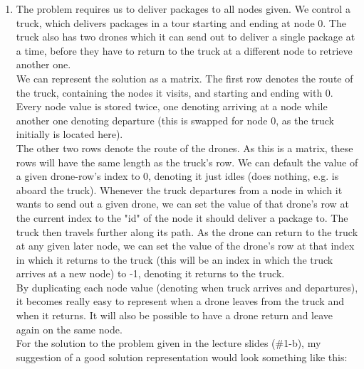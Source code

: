 \documentclass{article}
\begin{document}
\begin{enumerate}[label=(\alph*)]

    \item The problem requires us to deliver packages to all nodes given. We control a truck, which delivers packages in a tour starting and ending at node 0. The truck also has two drones which it can send out to deliver a single package at a time, before they have to return to the truck at a different node to retrieve another one.
    \\[10pt]
    We can represent the solution as a matrix. The first row denotes the route of the truck, containing the nodes it visits, and starting and ending with 0. Every node value is stored twice, one denoting arriving at a node while another one denoting departure (this is swapped for node 0, as the truck initially is located here).
    \\[10pt]
    The other two rows denote the route of the drones. As this is a matrix, these rows will have the same length as the truck's row. We can default the value of a given drone-row's index to 0, denoting it just idles (does nothing, e.g. is aboard the truck). Whenever the truck departures from a node in which it wants to send out a given drone, we can set the value of that drone's row at the current index to the "id" of the node it should deliver a package to. The truck then travels further along its path. As the drone can return to the truck at any given later node, we can set the value of the drone's row at that index in which it returns to the truck (this will be an index in which the truck arrives at a new node) to -1, denoting it returns to the truck.
    \\[10pt]
    By duplicating each node value (denoting when truck arrives and departures), it becomes really easy to represent when a drone leaves from the truck and when it returns. It will also be possible to have a drone return and leave again on the same node.
    \\[10pt]
    For the solution to the problem given in the lecture slides (\#1-b), my suggestion of a good solution representation would look something like this:
    \\[30pt]


\end{enumerate}
\end{document}
